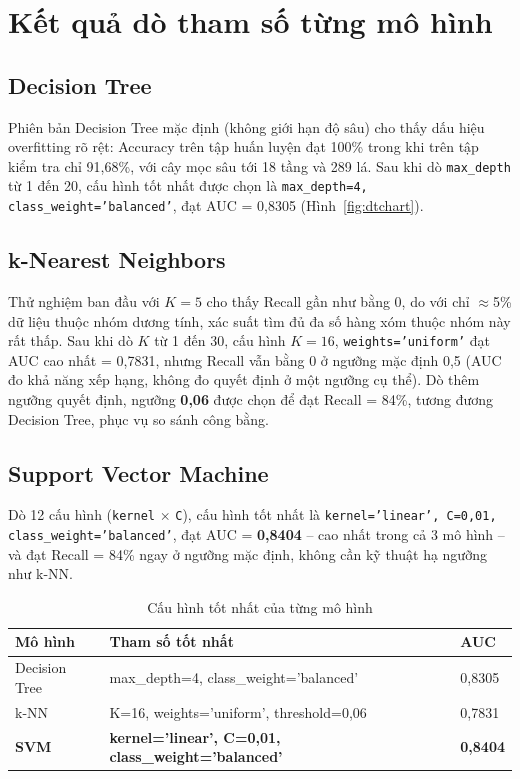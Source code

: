 \documentclass[12pt,a4paper]{report}
\begin{document}
\section{Kết quả dò tham số từng mô hình}

\subsection{Decision Tree}

Phiên bản Decision Tree mặc định (không giới hạn độ sâu) cho thấy dấu hiệu overfitting rõ rệt: Accuracy trên tập huấn luyện đạt 100\% trong khi trên tập kiểm tra chỉ 91,68\%, với cây mọc sâu tới 18 tầng và 289 lá. Sau khi dò \texttt{max\_depth} từ 1 đến 20, cấu hình tốt nhất được chọn là \texttt{max\_depth=4, class\_weight='balanced'}, đạt AUC = 0,8305 (Hình~\ref{fig:dtchart}).

\subsection{k-Nearest Neighbors}

Thử nghiệm ban đầu với $K=5$ cho thấy Recall gần như bằng 0, do với chỉ $\approx$5\% dữ liệu thuộc nhóm dương tính, xác suất tìm đủ đa số hàng xóm thuộc nhóm này rất thấp. Sau khi dò $K$ từ 1 đến 30, cấu hình $K=16$, \texttt{weights='uniform'} đạt AUC cao nhất = 0,7831, nhưng Recall vẫn bằng 0 ở ngưỡng mặc định 0,5 (AUC đo khả năng xếp hạng, không đo quyết định ở một ngưỡng cụ thể). Dò thêm ngưỡng quyết định, ngưỡng \textbf{0,06} được chọn để đạt Recall = 84\%, tương đương Decision Tree, phục vụ so sánh công bằng.

\subsection{Support Vector Machine}

Dò 12 cấu hình (\texttt{kernel} $\times$ \texttt{C}), cấu hình tốt nhất là \texttt{kernel='linear', C=0,01, class\_weight='balanced'}, đạt AUC = \textbf{0,8404} -- cao nhất trong cả 3 mô hình -- và đạt Recall = 84\% ngay ở ngưỡng mặc định, không cần kỹ thuật hạ ngưỡng như k-NN.

\begin{table}[H]
\centering
\caption{Cấu hình tốt nhất của từng mô hình}
\label{tab:cauhinh}
\begin{tabular}{lll}
\toprule
\textbf{Mô hình} & \textbf{Tham số tốt nhất} & \textbf{AUC} \\
\midrule
Decision Tree & max\_depth=4, class\_weight='balanced' & 0,8305 \\
k-NN & K=16, weights='uniform', threshold=0,06 & 0,7831 \\
\textbf{SVM} & \textbf{kernel='linear', C=0,01, class\_weight='balanced'} & \textbf{0,8404} \\
\bottomrule
\end{tabular}
\end{table}
\end{document}
